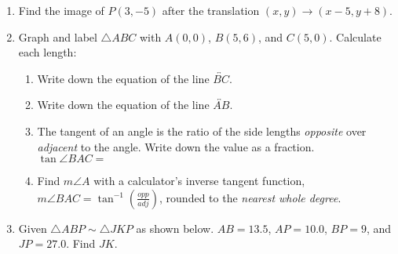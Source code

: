 \documentclass[12pt, twoside]{article}
\begin{document}
\begin{enumerate}
  \item Find the image of $P(3,-5)$ after the translation $(x,y) \rightarrow (x-5,y+8)$.
\newpage
  \item Graph and label $\triangle ABC$ with $A(0,0)$, $B(5,6)$, and $C(5,0)$. Calculate each length:
    \begin{enumerate}[itemsep=1.4cm]
    \item Write down the equation of the line $\overleftrightarrow{BC}$.
    \item Write down the equation of the line $\overleftrightarrow{AB}$. 
    \item The tangent of an angle is the ratio of the side lengths \emph{opposite} over \emph{adjacent} to the angle. Write down the value as a fraction. \\[0.5cm]
      $\tan \angle BAC=$
    \item Find $m\angle A$ with a calculator's inverse tangent function, $\displaystyle m \angle BAC = \tan^{-1}(\frac{opp}{adj})$, rounded to the \emph{nearest whole degree}.
    \vspace{2cm}
  \end{enumerate}

\newpage
  \item Given $\triangle ABP \sim \triangle JKP$ as shown below. $AB=13.5$, $AP=10.0$, $BP=9$, and $JP=27.0$. Find $JK$.
    \begin{flushright}
      \end{flushright}
      \vspace{0.5cm}
      

\end{enumerate}
\end{document}
